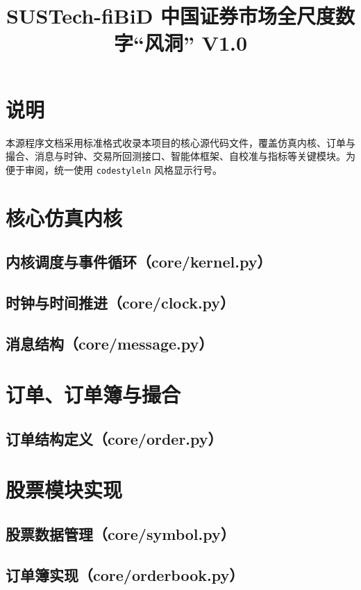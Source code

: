 \documentclass[code]{mancls}
\title{SUSTech-fiBiD 中国证券市场全尺度数字“风洞” V1.0}
\begin{document}
\section{说明}
本源程序文档采用标准格式收录本项目的核心源代码文件，覆盖仿真内核、订单与撮合、消息与时钟、交易所回测接口、智能体框架、自校准与指标等关键模块。为便于审阅，统一使用 \texttt{codestyleln} 风格显示行号。

\section{核心仿真内核}
\subsection{内核调度与事件循环（core/kernel.py）}


\subsection{时钟与时间推进（core/clock.py）}


\subsection{消息结构（core/message.py）}


\section{订单、订单簿与撮合}
\subsection{订单结构定义（core/order.py）}


\section{股票模块实现}
\subsection{股票数据管理（core/symbol.py）}


\subsection{订单簿实现（core/orderbook.py）}

\end{document}
